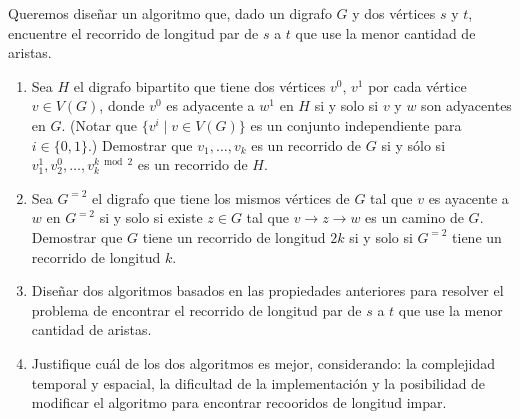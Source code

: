 

 \item Queremos diseñar un algoritmo que, dado un digrafo $G$ y dos vértices $s$ y $t$, encuentre el recorrido de longitud par de $s$ a $t$ que use la menor cantidad de aristas.

 \begin{enumerate}
  \item Sea $H$ el digrafo bipartito que tiene dos vértices $v^0$, $v^1$ por cada vértice $v \in V(G)$, donde $v^0$ es adyacente a $w^1$ en $H$ si y solo si $v$ y $w$ son adyacentes en $G$.  (Notar que $\{v^i \mid v \in V(G)\}$ es un conjunto independiente para $i \in \{0, 1\}$.)  Demostrar que $v_1, \ldots, v_k$ es un recorrido de $G$ si y sólo si $v_1^1, v_2^0, \ldots, v_k^{k \bmod 2}$ es un recorrido de $H$.

  \item Sea $G^{=2}$ el digrafo que tiene los mismos vértices de $G$ tal que $v$ es ayacente a $w$ en $G^{=2}$ si y solo si existe $z \in G$ tal que $v \to z \to w$ es un camino de $G$.  Demostrar que $G$ tiene un recorrido de longitud $2k$ si y solo si $G^{=2}$ tiene un recorrido de longitud $k$.

  \item Diseñar dos algoritmos basados en las propiedades anteriores para resolver el problema de encontrar el recorrido de longitud par de $s$ a $t$ que use la menor cantidad de aristas.

  \item Justifique cuál de los dos algoritmos es mejor, considerando: la complejidad temporal y espacial, la dificultad de la implementación y la posibilidad de modificar el algoritmo para encontrar recooridos de longitud impar.
 \end{enumerate}

